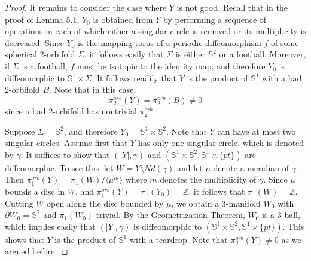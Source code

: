 \documentclass[11pt]{amsart}
\theoremstyle{plain}
\numberwithin{theorem}{section}
\theoremstyle{definition}
\begin{document}
\begin{proof}
It remains to consider the case where $Y$ is not good. Recall that in the proof of 
Lemma 5.1, $Y_0$ is obtained from $Y$ by performing a sequence of operations in each 
of which either a singular circle is removed or its multiplicity is decreased. 
Since $Y_0$  is the mapping torus of a periodic diffeomorphism $f$ of some spherical 
$2$-orbifold $\Sigma$, it follows easily that $\Sigma$ is either ${{\mathbb S}}^2$ or a football. 
Moreover, if $\Sigma$ is a football, $f$ must be isotopic to the identity map, and therefore
$Y_0$ is diffeomorphic to ${{\mathbb S}}^1\times \Sigma$.  It follows readily that $Y$ is the product 
of ${{\mathbb S}}^1$ with a bad $2$-orbifold $B$. Note that in this case,
$$
\pi_2^{orb}(Y)=\pi_2^{orb}(B)\neq 0
$$
since a bad $2$-orbifold has nontrivial $\pi_2^{orb}$. 

Suppose $\Sigma={{\mathbb S}}^2$, and therefore $Y_0={{\mathbb S}}^1\times{{\mathbb S}}^2$. Note that $Y$ can have 
at most two singular circles. Assume first that $Y$ has only one singular circle, 
which is denoted by $\gamma$.
It suffices to show that $(|Y|,\gamma)$ and $({{\mathbb S}}^1\times {{\mathbb S}}^2, {{\mathbb S}}^1\times \{pt\})$ are
diffeomorphic. To see this, let $W=Y\setminus Nd(\gamma)$ and let $\mu$
denote a meridian of $\gamma$. Then $\pi_1^{orb}(Y)=\pi_1(W)/\langle \mu^m\rangle$
where $m$ denotes the multiplicity of $\gamma$. Since $\mu$ bounds a disc in $W$, and
$\pi_1^{orb}(Y)=\pi_1(Y_0)={{\mathbb Z}}$, it follows that $\pi_1(W)={{\mathbb Z}}$. Cutting $W$ open along
the disc bounded by $\mu$, we obtain a $3$-manifold $W_0$ with $\partial W_0={{\mathbb S}}^2$
and $\pi_1(W_0)$ trivial. By the Geometrization Theorem, $W_0$ is a $3$-ball, which implies
easily that $(|Y|,\gamma)$ is diffeomorphic to $({{\mathbb S}}^1\times {{\mathbb S}}^2, {{\mathbb S}}^1\times \{pt\})$. 
This shows that $Y$ is the product of ${{\mathbb S}}^1$ with a teardrop.  Note that $\pi_2^{orb}(Y)\neq 0$
as we argued before.


\end{proof}
\end{document}

